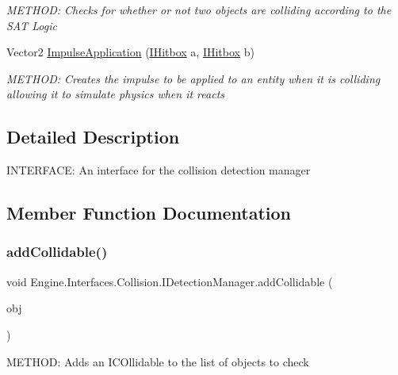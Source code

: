 \begin{DoxyCompactItemize}
\begin{DoxyCompactList}\small\item\em M\+E\+T\+H\+OD\+: Checks for whether or not two objects are colliding according to the S\+AT Logic \end{DoxyCompactList}\item 
Vector2 \hyperlink{a00430_a853912077b127d7e6779accc914df3cf}{Impulse\+Application} (\hyperlink{a00434}{I\+Hitbox} a, \hyperlink{a00434}{I\+Hitbox} b)
\begin{DoxyCompactList}\small\item\em M\+E\+T\+H\+OD\+: Creates the impulse to be applied to an entity when it is colliding allowing it to simulate physics when it reacts \end{DoxyCompactList}\end{DoxyCompactItemize}


\subsection{Detailed Description}
I\+N\+T\+E\+R\+F\+A\+CE\+: An interface for the collision detection manager 



\subsection{Member Function Documentation}
\mbox{\label{a00430_a11808ec009ee682fa73e3c4ea6570139}} 
\subsubsection{\texorpdfstring{add\+Collidable()}{addCollidable()}}
{\footnotesize\ttfamily void Engine.\+Interfaces.\+Collision.\+I\+Detection\+Manager.\+add\+Collidable (\begin{DoxyParamCaption}\item[{\hyperlink{a00426}{I\+Collidable}}]{obj }\end{DoxyParamCaption})}



M\+E\+T\+H\+OD\+: Adds an I\+C\+Ollidable to the list of objects to check 


